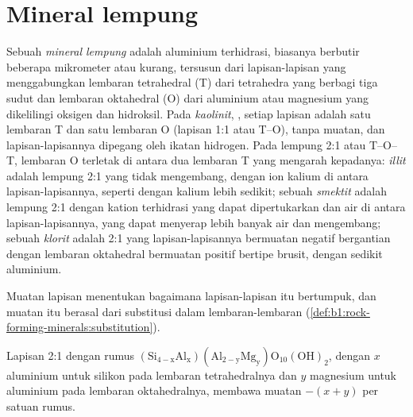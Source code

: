 \section{Mineral lempung}\label{sec:b1:weathering-clays:clays}

\begin{definition}\label{def:b1:weathering-clays:clay-mineral}
Sebuah \emph{mineral lempung} adalah  aluminium terhidrasi, biasanya berbutir beberapa mikrometer atau kurang, tersusun dari lapisan-lapisan yang menggabungkan lembaran tetrahedral (T) dari tetrahedra  yang berbagi tiga sudut dan lembaran oktahedral (O) dari aluminium atau magnesium yang dikelilingi oksigen dan hidroksil. Pada \emph{kaolinit}, , setiap lapisan adalah satu lembaran T dan satu lembaran O (lapisan 1:1 atau T--O), tanpa muatan, dan lapisan-lapisannya dipegang oleh ikatan hidrogen. Pada  lempung 2:1 atau T--O--T, lembaran O terletak di antara dua lembaran T yang mengarah kepadanya: \emph{illit} adalah  lempung 2:1 yang tidak mengembang, dengan ion kalium di antara lapisan-lapisannya, seperti  dengan kalium lebih sedikit; sebuah \emph{smektit} adalah  lempung 2:1 dengan kation terhidrasi yang dapat dipertukarkan dan air di antara lapisan-lapisannya, yang dapat menyerap lebih banyak air dan mengembang; sebuah \emph{klorit} adalah  2:1 yang lapisan-lapisannya bermuatan negatif bergantian dengan lembaran oktahedral bermuatan positif bertipe brusit,  dengan sedikit aluminium.
\end{definition}

Muatan lapisan menentukan bagaimana lapisan-lapisan itu bertumpuk, dan muatan itu berasal dari substitusi dalam lembaran-lembaran (\cref{def:b1:rock-forming-minerals:substitution}).

\begin{proposition}\label{prop:b1:weathering-clays:layer-charge}
Lapisan 2:1 dengan rumus $\mathrm{(Si_{4-x}Al_x)(Al_{2-y}Mg_y)O_{10}(OH)_2}$, dengan $x$ aluminium untuk silikon pada lembaran tetrahedralnya dan $y$ magnesium untuk aluminium pada lembaran oktahedralnya, membawa muatan $-(x + y)$ per satuan rumus.
\end{proposition}

